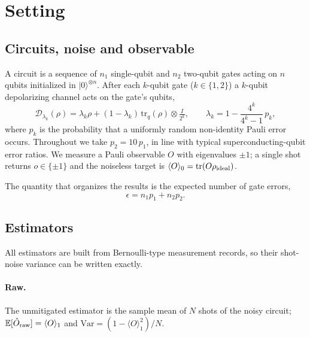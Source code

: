 \documentclass[11pt,a4paper]{article}
\theoremstyle{remark}
\newcommand{\E}{\mathbb{E}}
\newcommand{\Var}{\mathrm{Var}}
\newcommand{\tr}{\mathrm{tr}}
\newcommand{\eps}{\epsilon}
\begin{document}
\section{Setting}
\label{sec:setting}

\subsection{Circuits, noise and observable}

A circuit is a sequence of $n_1$ single-qubit and $n_2$ two-qubit gates acting on $n$ qubits initialized in $|0\rangle^{\otimes n}$. After each $k$-qubit gate ($k\in\{1,2\}$) a $k$-qubit depolarizing channel acts on the gate's qubits,
\begin{equation}
\mathcal D_{\lambda_k}(\rho)=\lambda_k\rho+(1-\lambda_k)\,\tr_{q}(\rho)\otimes \tfrac{I}{2^k},
\qquad \lambda_k = 1-\frac{4^k}{4^k-1}\,p_k,
\label{eq:depol}
\end{equation}
where $p_k$ is the probability that a uniformly random non-identity Pauli error occurs. Throughout we take $p_2=10\,p_1$, in line with typical superconducting-qubit error ratios. We measure a Pauli observable $O$ with eigenvalues $\pm1$; a single shot returns $o\in\{\pm1\}$ and the noiseless target is $\langle O\rangle_0 = \tr(O\rho_{\rm ideal})$.

The quantity that organizes the results is the expected number of gate errors,
\begin{equation}
\eps = n_1p_1+n_2p_2 .
\end{equation}

\subsection{Estimators}

All estimators are built from Bernoulli-type measurement records, so their shot-noise variance can be written exactly.

\paragraph{Raw.} The unmitigated estimator is the sample mean of $N$ shots of the noisy circuit; $\E[\hat O_{\rm raw}]=\langle O\rangle_1$ and $\Var = (1-\langle O\rangle_1^2)/N$.
\end{document}
